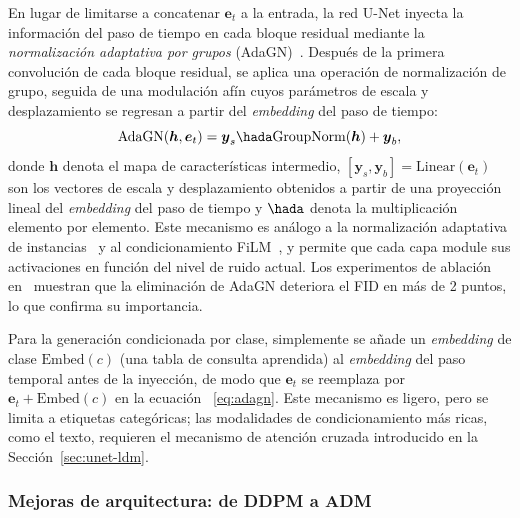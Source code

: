 \documentclass[../../book-main_es.tex]{subfiles}
\begin{document}
En lugar de limitarse a concatenar $\boldsymbol{e}_t$ a la entrada, la red U-Net inyecta la 
información del paso de tiempo en cada bloque residual mediante la \emph{normalización 
adaptativa por grupos} (AdaGN)~\citep{dhariwal2021diffusion}. Después de la primera convolución 
de cada bloque residual, se aplica una operación de normalización de grupo, seguida de 
una modulación afín cuyos parámetros de escala y desplazamiento se regresan a partir del 
\textit{embedding} del paso de tiempo:
\begin{equation}
    \mathrm{AdaGN}(\boldsymbol{h}, \boldsymbol{e}_t) = \boldsymbol{y}_s \hada \mathrm{GroupNorm}(\boldsymbol{h}) + \boldsymbol{y}_b,
    \label{eq:adagn}
\end{equation}
donde $\boldsymbol{h}$ denota el mapa de características intermedio, 
$[\boldsymbol{y}_s, \boldsymbol{y}_b] = \mathrm{Linear}(\boldsymbol{e}_t)$ 
son los vectores de escala y desplazamiento obtenidos a partir de una proyección lineal 
del \textit{embedding} del paso de tiempo y $\hada$ denota la multiplicación elemento por 
elemento. Este mecanismo es análogo a la normalización adaptativa de 
instancias~\citep{dumoulin2017learned} y al condicionamiento FiLM~\citep{perez2018film}, 
y permite que cada capa module sus activaciones en función del nivel de ruido actual. 
Los experimentos de ablación en~\citep{dhariwal2021diffusion} muestran que la eliminación 
de AdaGN deteriora el FID en más de 2 puntos, lo que confirma su importancia.

Para la generación condicionada por clase, simplemente se añade un \textit{embedding} de clase 
$\mathrm{Embed}(c)$ (una tabla de consulta aprendida) al \textit{embedding} del paso temporal 
antes de la inyección, de modo que $\boldsymbol{e}_t$ se reemplaza por 
$\boldsymbol{e}_t + \mathrm{Embed}(c)$ en la ecuación ~\eqref{eq:adagn}. Este mecanismo es 
ligero, pero se limita a etiquetas categóricas; las modalidades de condicionamiento más 
ricas, como el texto, requieren el mecanismo de atención cruzada introducido en 
la Sección~\ref{sec:unet-ldm}.

\subsubsection{Mejoras de arquitectura: de DDPM a ADM}
\label{sec:unet-adm}
\end{document}
